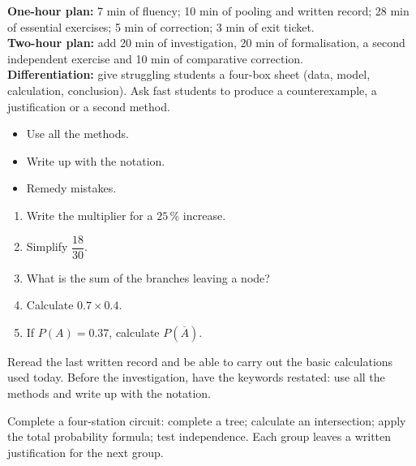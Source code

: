     \ifprof
    \begin{methode}
    \textbf{One-hour plan:} 7 min of fluency; 10 min of pooling and written record; 28 min of essential exercises; 5 min of correction; 3 min of exit ticket.\\
    \textbf{Two-hour plan:} add 20 min of investigation, 20 min of formalisation, a second independent exercise and 10 min of comparative correction.\\
    \textbf{Differentiation:} give struggling students a four-box sheet (data, model, calculation, conclusion). Ask fast students to produce a counterexample, a justification or a second method.
    \end{methode}
    \fi
{}
\begin{objectifs}\begin{itemize}\item Use all the methods.\item Write up with the notation.\item Remedy mistakes.\end{itemize}\end{objectifs}
\begin{automatismes}\begin{enumerate}\item Write the multiplier for a $25\,\%$ increase. \item Simplify $\dfrac{18}{30}$. \item What is the sum of the branches leaving a node? \item Calculate $0.7\times0.4$. \item If $P(A)=0.37$, calculate $P(\overline A)$. \end{enumerate}\end{automatismes}
\begin{prerequis}Reread the last written record and be able to carry out the basic calculations used today. Before the investigation, have the keywords restated: use all the methods and write up with the notation.\end{prerequis}

\begin{activite}
Complete a four-station circuit: complete a tree; calculate an intersection; apply the total probability formula; test independence. Each group leaves a written justification for the next group.

\end{activite}

